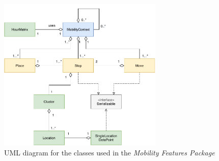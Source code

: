 \begin{figure}[h]
    \centering
    \includegraphics[width=0.7\textwidth]{./images/uml-mobility.pdf}
    \caption{UML diagram for the classes used in the \textit{Mobility Features Package}}
    \label{fig:my_label}
\end{figure}


